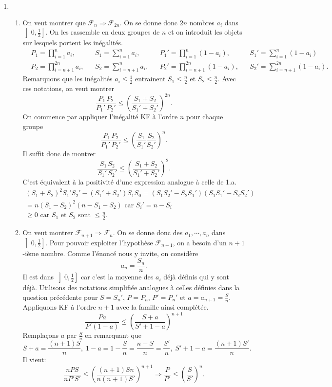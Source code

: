 \begin{enumerate}
 \item
\begin{enumerate}
 \item On veut montrer que $\mathcal{F}_{n}\Rightarrow \mathcal{F}_{2n}$. On se donne donc $2n$ nombres $a_i$ dans $\left] 0 , \frac{1}{2}\right]$. On les rassemble en deux groupes de $n$ et on introduit les objets sur lesquels portent les inégalités.
\begin{align*}
 &P_1 = \prod_{i=1}^{n}a_i,&    &S_1 = \sum_{i=1}^{n}a_i,&   &P_1' = \prod_{i=1}^{n}(1-a_i),&    &S_1' = \sum_{i=1}^{n}(1-a_i)\\ 
 &P_2 = \prod_{i=n+1}^{2n}a_i,& &S_2 = \sum_{i=n+1}^{n}a_i,& &P_2' = \prod_{i=n+1}^{2n}(1-a_i),& &S_2' = \sum_{i=n+1}^{2n}(1-a_i).
\end{align*}
Remarquons que les inégalités $a_i\leq \frac{1}{2}$ entrainent $S_1 \leq \frac{n}{2}$ et $S_2 \leq \frac{n}{2}$.\newline
Avec ces notations, on veut montrer
\[
 \frac{P_1\,P_2}{P_1'\,P_2'} \leq \left( \frac{S_1 + S_2}{S_1' + S_2'}\right)^{2n}. 
\]
On commence par appliquer l'inégalité KF à l'ordre $n$ pour chaque groupe
\[
 \frac{P_1\,P_2}{P_1'\,P_2'} \leq \left( \frac{S_1}{S_1'} \frac{S_2}{S_2'}\right)^{n}.
\]
Il suffit donc de montrer
\[
 \frac{S_1\,S_2}{S_1'\,S_2'} \leq \left( \frac{S_1 + S_2}{S_1' + S_2'}\right)^2. 
\]
C'est équivalent à la positivité d'une expression analogue à celle de 1.a.
\begin{multline*}
(S_1 + S_2)^2S_1'S_2' - (S_1'+ S_2')S_1S_0
 = (S_1S_2' - S_2 S_1')(S_1S_1' - S_2S_2')\\
 = n(S_1-S_2)^2(n-S_1-S_2)\text{ car }S_i' = n - S_i \\
 \geq 0 \text{ car $S_1$ et $S_2$ sont } \leq \frac{n}{2}.
\end{multline*}

 \item On veut montrer $\mathcal{F}_{n+1} \Rightarrow \mathcal{F}_{n}$. On se donne donc des $a_1, \cdots,a_{n}$ dans $\left]0, \frac{1}{2}\right]$.\newline
 Pour pouvoir exploiter l'hypothèse $\mathcal{F}_{n+1}$, on a besoin d'un $n+1$-ième nombre. Comme l'énoncé nous y invite, on considère
 \[
  a_n = \frac{S_n}{n}. 
 \]
Il est dans $\left]0, \frac{1}{2}\right]$ car c'est la moyenne des $a_i$ déjà définis qui y sont déjà.\newline
Utilisons des notations simplifiée analogues à celles définies dans la question précédente pour $S = S_n'$, $P = P_n$, $P' = P_n'$ et $a = a_{n+1}=\frac{S}{n}$.\newline
Appliquons KF à l'ordre $n+1$ avec la famille ainsi complétée.
\[
 \frac{P a}{P'(1-a)}
 \leq \left( \frac{S + a}{S' + 1 - a}\right)^{n+1} 
\]
Remplaçons $a$ par $\frac{S}{n}$ en remarquant que 
\[
 S+a = \frac{(n+1)S}{n}, \; 1-a = 1 - \frac{S}{n} = \frac{n-S}{n} = \frac{S'}{n}, \;
 S' + 1 -a = \frac{(n+1)S'}{n}.
\]
Il vient:
\[
 \frac{nPS}{nP'S'} \leq \left( \frac{(n+1)Sn}{n(n+1)S'}\right)^{n+1} 
 \Rightarrow 
 \frac{P}{P'} \leq \left( \frac{S}{S'}\right)^{n}. 
\]


\end{enumerate}
\end{enumerate}
